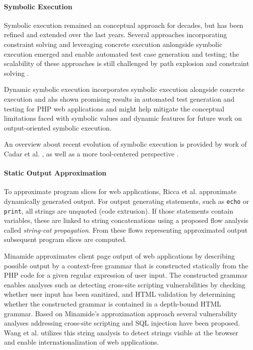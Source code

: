 \documentclass[sigconf]{acmart}
\renewcommand{\tt}[1]{\texttt{#1}}
\begin{document}
\paragraph{Symbolic Execution}
Symbolic execution \cite{King1976,Darringer1978} remained an conceptual approach
for decades, but has been refined and extended over the last years. Several
approaches incorporating constraint solving and leveraging concrete execution
anlongside symbolic execution emerged and enable automated test case generation
and testing; the scalability of these approaches is still challenged by path
explosion and constraint solving \cite{CadarSen2013}. 

Dynamic symbolic execution \cite{CadarSen2013} incorporates symbolic execution
alongside concrete execution and ahs shown promising results in automated test
generation and testing \cite{artzi_finding_2008,artzi_finding_2010,DynamicWassermann} for PHP web
applications and might help mitigate the conceptual limitations faced with
symbolic values and dynamic features for future work on output-oriented
symbolic execution.

An overview about recent evolution of symbolic execution is provided by work of Cadar et al.
\cite{CadarSen2013}, as well as a more tool-centered perspective \cite{Cadar2011}.

\paragraph{Static Output Approximation}
To approximate program slices for web
applications, Ricca et al. \cite{tonella_web_2005,tonella_2001,tonella_2002} approximate
dynamically generated output. For output generating statements, such as \tt{echo} or
\tt{print}, all strings are unquoted (code extrusion). If those statements
contain variables, these are linked to string concatenations using a
proposed flow analysis called \emph{string-cat propagation}. From these
flows representing approximated output subsequent program slices are computed.

Minamide \cite{minamide_static_2005} approximates client page output
of web applications by describing possible output by a context-free
grammar that is constructed statically from the PHP code for a given regular
expression of user input. The constructed grammar enables analyses such as
detecting cross-site scripting vulnerabilities by checking whether user input
has been sanitized, and HTML validation by determining whether the constructed
grammar is contained in a depth-bound HTML grammar. Based on Minamide's
approximation approach several vulnerability analyses addressing cross-site
scripting \cite{wassermann_static_2008} and SQL injection
\cite{wassermann2007sound} have been proposed. Wang et al.
\cite{wang_locating_2010} utilizes this string analysis to detect strings
visible at the browser and enable internationalization of web applications.
    
\end{document}

